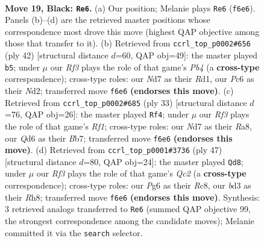 \documentclass[11pt]{article}
\begin{document}
\clearpage

\begin{figure}[p]\centering
\begin{subfigure}{0.46\textwidth}\centering
\resizebox{\linewidth}{!}{%
\newchessgame
\chessboard[
  setfen={r1b3k1/pp1n3p/2pq1rp1/3p2p1/3P4/2NBPPP1/PP3K1P/2RQR3 b - - 2 19},
  showmover=false,
  pgfstyle=straightmove, color=movearrow, markmove={f6-e6}
]}
\caption{}
\end{subfigure}\hfill
\begin{subfigure}{0.46\textwidth}\centering
\resizebox{\linewidth}{!}{%
\newchessgame
\chessboard[
  setfen={2r1qr2/p2n2pk/2b1p2p/2p2p2/1P2PP2/P2Q1P2/3N2BP/2RR2K1 w - - 0 22},
  showmover=false,
  pgfstyle=straightmove, color=movearrow, markmove={b4-b5}
]}
\caption{}
\end{subfigure}
\\[4pt]
\begin{subfigure}{0.46\textwidth}\centering
\resizebox{\linewidth}{!}{%
\newchessgame
\chessboard[
  setfen={r4rk1/pbpp2pp/np2p2q/7P/2PP4/6N1/PP3PP1/RB1Q1RK1 b - - 5 17},
  showmover=false,
  pgfstyle=straightmove, color=movearrow, markmove={f8-f4}
]}
\caption{}
\end{subfigure}\hfill
\begin{subfigure}{0.46\textwidth}\centering
\resizebox{\linewidth}{!}{%
\newchessgame
\chessboard[
  setfen={2r2k1r/2qb1pp1/4p3/pp1nP1pP/2pPB1Q1/P7/1P3PPN/R3R1K1 b - - 3 24},
  showmover=false,
  pgfstyle=straightmove, color=movearrow, markmove={c7-d8}
]}
\caption{}
\end{subfigure}
\caption{\textbf{Move 19, Black: \texttt{Re6}.} (a) Our position; Melanie plays \texttt{Re6} (\texttt{f6e6}). Panels (b)--(d) are the retrieved master positions whose correspondence most drove this move (highest QAP objective among those that transfer to it). (b) Retrieved from \texttt{ccrl\_top\_p0002\#656} (ply 42) [structural distance $d$=60, QAP obj=49]: the master played \texttt{b5}; under $\mu$ our \emph{Rf3} plays the role of that game's \emph{Pb4} (a \textbf{cross-type} correspondence); cross-type roles: our \emph{N}d7 as their \emph{R}d1, our \emph{P}c6 as their \emph{N}d2; transferred move \texttt{f6e6} \textbf{(endorses this move)}. (c) Retrieved from \texttt{ccrl\_top\_p0002\#685} (ply 33) [structural distance $d$=76, QAP obj=26]: the master played \texttt{Rf4}; under $\mu$ our \emph{Rf3} plays the role of that game's \emph{Rf1}; cross-type roles: our \emph{N}d7 as their \emph{R}a8, our \emph{Q}d6 as their \emph{B}b7; transferred move \texttt{f6e6} \textbf{(endorses this move)}. (d) Retrieved from \texttt{ccrl\_top\_p0001\#3736} (ply 47) [structural distance $d$=80, QAP obj=24]: the master played \texttt{Qd8}; under $\mu$ our \emph{Rf3} plays the role of that game's \emph{Qc2} (a \textbf{cross-type} correspondence); cross-type roles: our \emph{P}g6 as their \emph{R}c8, our \emph{b}d3 as their \emph{R}h8; transferred move \texttt{f6e6} \textbf{(endorses this move)}. Synthesis: 3 retrieved analogs transferred to \texttt{Re6} (summed QAP objective 99, the strongest correspondence among the candidate moves); Melanie committed it via the \texttt{search} selector.}
\label{fig:thought-m37}
\end{figure}
\end{document}
